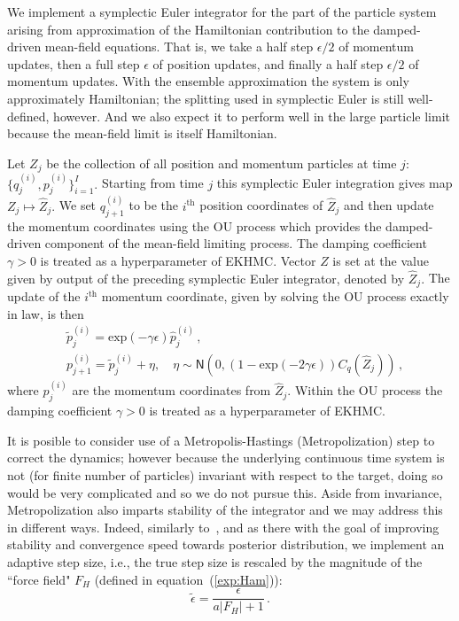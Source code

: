 \documentclass[12pt]{caltech_thesis}
\numberwithin{equation}{section}
\begin{document}
{We implement a symplectic Euler  integrator \cite{sanz2018numerical} for 
the part of the particle system arising from approximation of
the Hamiltonian contribution
to the damped-driven mean-field equations. That is, we take a half 
step $\epsilon/2$ of momentum updates, then a full step $\epsilon$ of position updates, and finally a half step $\epsilon/2$ of momentum updates.
With the ensemble approximation the system is only approximately Hamiltonian; 
the splitting used in symplectic Euler is still well-defined, however. And we
also expect it to perform well in the large particle limit because
the mean-field limit is itself Hamiltonian.} {Let $Z_j$ be the collection of
all position and momentum particles at time $j$: $\{q_{j}^{(i)},p_{j}^{(i)}\}_{i=1}^I.$ Starting from time $j$ this
symplectic Euler integration gives map $Z_{j} \mapsto \hat{Z}_{j}.$
We set $q_{j+1}^{(i)}$ to be the $i^{\text{th}}$ position coordinates of $\hat{Z}_{j}$
and then update the momentum coordinates using the OU process {which provides
the damped-driven component of the mean-field limiting process.} 
The damping coefficient $\gamma>0$ is treated as a hyperparameter of EKHMC. 
{Vector $Z$ is set at the value given 
by output of the preceding symplectic Euler integrator, denoted by $\hat{Z}_{j}$.}
The update of the $i^{\text{th}}$ momentum coordinate, {given by 
solving the OU process exactly in law,} is then
\begin{equation}
\begin{aligned}
    & \tilde{p}^{(i)}_j={\text{exp}}(-\gamma\epsilon)\hat{p}^{(i)}_j\,, \\
    & p^{(i)}_{j+1} = \tilde{p}^{(i)}_j+\eta,\quad \eta\sim \mathsf{N}
    (0,(1-{\text{exp}}(-2\gamma\epsilon))C_q(\hat{Z}_{j}))\, ,
\end{aligned}
\end{equation}
{where $\hat{p}^{(i)}_j$ are the momentum coordinates from $\hat{Z}_{j}$.}
Within the OU process the damping coefficient $\gamma>0$ is treated as a hyperparameter of EKHMC.


{It is posible to consider use of a Metropolis-Hastings (Metropolization)
step to correct the dynamics; however because the underlying continuous
time system is not (for finite number of particles) invariant
with respect to the target, doing so would be very complicated
and so we do not pursue this. Aside from invariance,
Metropolization also imparts stability of the integrator and we may address
this in different ways. Indeed, similarly} 
to~\cite{garbuno2020interacting}, and as there 
with the goal of improving stability
and convergence speed towards posterior distribution, we implement an adaptive step size, i.e., the true step size is rescaled by the magnitude of the ``force field" $F_H$ (defined in equation~(\ref{exp:Ham})):
\begin{equation}
    \tilde{\epsilon}=\frac{\epsilon}{a|F_H|+1}\,.
\end{equation}


}
\end{document}
